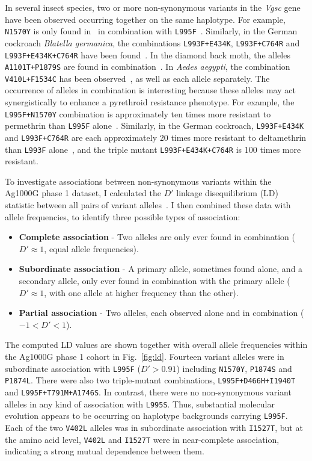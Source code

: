\begin{refsection}
In several insect species, two or more non-synonymous variants in the \textit{Vgsc} gene have been observed occurring together on the same haplotype.
%
For example, \texttt{N1570Y} is only found in \agam\ in combination with \texttt{L995F}~\parencite{Jones2012}.
%
Similarly, in the German cockroach \textit{Blatella germanica}, the combinations \texttt{L993F+E434K}, \texttt{L993F+C764R} and \texttt{L993F+E434K+C764R} have been found~\parencite{Tan2002}.
%
In the diamond back moth, the alleles \texttt{A1101T+P1879S} are found in combination~\parencite{Sonoda2010}.
%
In \textit{Aedes aegypti}, the combination \texttt{V410L+F1534C} has been observed~\parencite{Haddi2017}, as well as each allele separately.
%
The occurrence of alleles in combination is interesting because these alleles may act synergistically to enhance a pyrethroid resistance phenotype.
%
For example, the \texttt{L995F+N1570Y} combination is approximately ten times more resistant to permethrin than \texttt{L995F} alone~\parencite{Wang2015}.
%
Similarly, in the German cockroach, \texttt{L993F+E434K} and \texttt{L993F+C764R} are each approximately 20 times more resistant to deltamethrin than \texttt{L993F} alone~\parencite{Tan2002}, and the triple mutant \texttt{L993F+E434K+C764R} is 100 times more resistant.


To investigate associations between non-synonymous variants within the Ag1000G phase 1 dataset, I calculated the $D'$ linkage disequilibrium (LD) statistic between all pairs of variant alleles~\parencite{Lewontin1964}.
%
I then combined these data with allele frequencies, to identify three possible types of association:
%
\begin{itemize}
    \item \textbf{Complete association} - Two alleles are only ever found in combination ($D' \approx 1$, equal allele frequencies).
    \item \textbf{Subordinate association} - A primary allele, sometimes found alone, and a secondary allele, only ever found in combination with the primary allele ($D' \approx 1$, with one allele at higher frequency than the other).
    \item \textbf{Partial association} - Two alleles, each observed alone and in combination ($-1 < D' < 1$).
\end{itemize}


The computed LD values are shown together with overall allele frequencies within the Ag1000G phase 1 cohort in Fig.~\ref{fig:ld}.
%
Fourteen variant alleles were in subordinate association with \texttt{L995F} ($D' > 0.91$) including \texttt{N1570Y}, \texttt{P1874S} and \texttt{P1874L}.
%
There were also two triple-mutant combinations, \texttt{L995F+D466H+I1940T} and \texttt{L995F+T791M+A1746S}.
%
In contrast, there were no non-synonymous variant alleles in any kind of association with \texttt{L995S}.
%
Thus, substantial molecular evolution appears to be occurring on haplotype backgrounds carrying \texttt{L995F}.
%
Each of the two \texttt{V402L} alleles was in subordinate association with \texttt{I1527T}, but at the amino acid level, \texttt{V402L} and \texttt{I1527T} were in near-complete association, indicating a strong mutual dependence between them.



\end{refsection}
